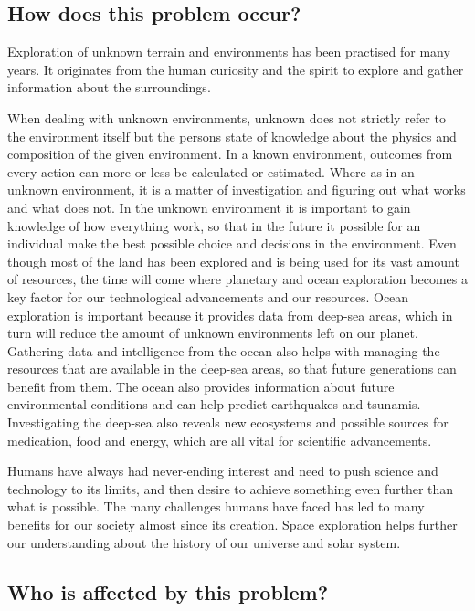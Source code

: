 \subsection{How does this problem occur?}

Exploration of unknown terrain and environments has been practised for many years. It originates from the human curiosity and the spirit to explore and gather information about the surroundings.

When dealing with unknown environments, unknown does not strictly refer to the environment itself but the persons state of knowledge about the physics and composition of the given environment. In a known environment, outcomes from every action can more or less be calculated or estimated. Where as in an unknown environment, it is a matter of investigation and figuring out what works and what does not. In the unknown environment it is important to gain knowledge of how everything work, so that in the future it possible for an individual make the best possible choice and decisions in the environment.\cite{aiint}
Even though most of the land has been explored and is being used for its vast amount of resources, the time will come where planetary and ocean exploration becomes a key factor for our technological advancements and our resources. Ocean exploration is important because it provides data from deep-sea areas, which in turn will reduce the amount of unknown environments left on our planet.
Gathering data and intelligence from the ocean also helps with managing the resources that are available in the deep-sea areas, so that future generations can benefit from them. The ocean also provides information about future environmental conditions and can help predict earthquakes and tsunamis. Investigating the deep-sea also reveals new ecosystems and possible sources for medication, food and energy, which are all vital for scientific advancements.\cite{oceanexplo}

Humans have always had never-ending interest and need to push science and technology to its limits, and then desire to achieve something even further than what is possible.  The many challenges humans have faced has led to many benefits for our society almost since its creation. Space exploration helps further our understanding about the history of our universe and solar system. %
\cite{whyweexplo}

\subsection{Who is affected by this problem?}

